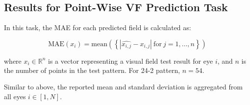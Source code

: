 \subsection{Results for Point-Wise \acl{VF} Prediction Task}

In this task, the \ac{MAE} for each predicted field is calculated as:

\begin{equation}
\textrm{MAE}(x_i)=\textrm{mean}(\left\{\left| \hat{x_{i,j}} - x_{i,j} \right|\ \textrm{for}\ j = 1,\ldots,n\right\})
\end{equation}

where $x_i\in\mathbb{R}^{n}$ is a vector representing a visual field test result for eye $i$, and $n$ is the number of points in the test pattern. For 24-2 pattern, $n=54$.

Similar to above, the reported mean and standard deviation is aggregated from all eyes $i\in \left[ 1,N \right]$.

